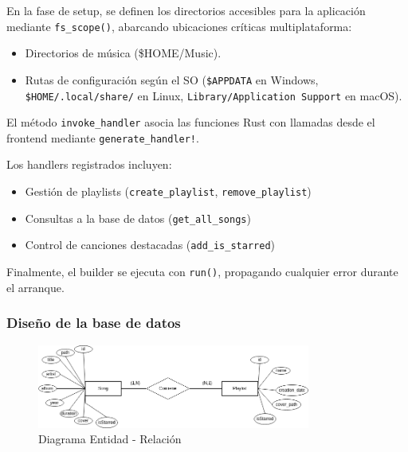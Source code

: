 \documentclass[11pt, a4paper]{article}
\begin{document}
            En la fase de setup, se definen los directorios accesibles para la aplicación mediante \verb|fs_scope()|, abarcando ubicaciones críticas multiplataforma:

            \begin{itemize}
              \item Directorios de música (\$HOME/Music).
              \item Rutas de configuración según el SO (\verb|$APPDATA| en Windows, \verb|$HOME/.local/share/| en Linux, \verb|Library/Application Support| en macOS).
            \end{itemize}

            El método \verb|invoke_handler| asocia las funciones Rust con llamadas desde el frontend mediante \verb|generate_handler!|.

            Los handlers registrados incluyen:

            \begin{itemize}
              \item Gestión de playlists (\verb|create_playlist|, \verb|remove_playlist|)
              \item Consultas a la base de datos (\verb|get_all_songs|)
              \item Control de canciones destacadas (\verb|add_is_starred|)
            \end{itemize}

            Finalmente, el builder se ejecuta con \verb|run()|, propagando cualquier error durante el arranque.

            \subsubsection{Diseño de la base de datos}

            \begin{figure}[H]
              \centering
              \includegraphics[width=0.8\textwidth]{media/ER.drawio.png}
              \caption{Diagrama Entidad - Relación}
              \label{fig:er}
            \end{figure}
\end{document}
